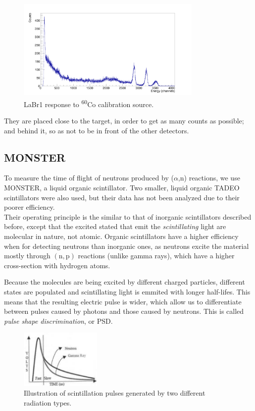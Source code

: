 \documentclass[a4paper,12pt]{report}
\newcommand{\an}{($\alpha$,n) }
\begin{document}
\begin{figure}[H]
	\centering
	\includegraphics[width=0.80\textwidth]{labr_co60_calibration.png}
	\caption{LaBr1 response to \textsuperscript{60}Co calibration source.}
	\label{labr_co60_calibration}
\end{figure}

They are placed close to the target, in order to get as many counts as possible; and behind it, so as not to be in front of the other detectors.

\subsection{MONSTER}
To measure the time of flight of neutrons produced by \an reactions, we use MONSTER, a liquid organic scintillator.
Two smaller, liquid organic TADEO scintillators were also used, but their data has not been analyzed due to their poorer efficiency.
\\

Their operating principle is the similar to that of inorganic scintillators described before, except that the excited stated that emit the \textit{scintillating} light are molecular in nature, not atomic.
Organic scintillators have a higher efficiency when for detecting neutrons than inorganic ones, as neutrons excite the material mostly through $\left( \text{n},\text{p}  \right)$ reactions (unlike gamma rays), which have a higher cross-section with hydrogen atoms.

Because the molecules are being excited by different charged particles, different states are populated and scintillating light is emmited with longer half-lifes.
This means that the resulting electric pulse is wider, which allow us to differentiate between pulses caused by photons and those caused by neutrons.
This is called \textit{pulse shape discrimination}, or PSD.

\begin{figure}[H]
	\centering
	\includegraphics[width=0.35\textwidth]{psd_explanation.png}
	\caption{Illustration of scintillation pulses generated by two different radiation types.}	%
	\label{psd_explanation}
\end{figure}
\end{document}
